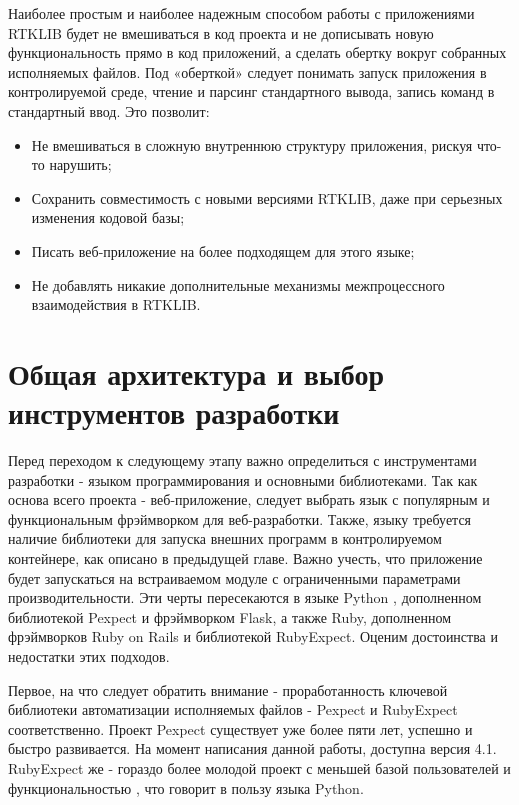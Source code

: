 Наиболее простым и наиболее надежным способом работы с приложениями RTKLIB будет не вмешиваться в код проекта и не дописывать новую функциональность прямо в код приложений, а сделать обертку вокруг собранных исполняемых файлов. Под «оберткой» следует понимать запуск приложения в контролируемой среде, чтение и парсинг стандартного вывода, запись команд в стандартный ввод. Это позволит:

\begin{itemize}
  \item Не вмешиваться в сложную внутреннюю структуру приложения, рискуя что-то нарушить;
  \item Сохранить совместимость с новыми версиями RTKLIB, даже при серьезных изменения кодовой базы;
  \item Писать веб-приложение на более подходящем для этого языке;
  \item Не добавлять никакие дополнительные механизмы межпроцессного взаимодействия в RTKLIB.
\end{itemize}


\section{Общая архитектура и выбор инструментов разработки} \label{sect2_4}

Перед переходом к следующему этапу важно определиться с инструментами разработки - языком программирования и основными библиотеками. Так как основа всего проекта - веб-приложение, следует выбрать язык с популярным и функциональным фрэймворком для веб-разработки. Также, языку требуется наличие библиотеки для запуска внешних программ в контролируемом контейнере, как описано в предыдущей главе. Важно учесть, что приложение будет запускаться на встраиваемом модуле с ограниченными параметрами производительности. Эти черты пересекаются в языке Python \cite{dive-into-python}, дополненном библиотекой Pexpect и фрэймворком Flask, а также Ruby, дополненном фрэймворков Ruby on Rails и библиотекой RubyExpect. Оценим достоинства и недостатки этих подходов.

Первое, на что следует обратить внимание - проработанность ключевой библиотеки автоматизации исполняемых файлов - Pexpect и RubyExpect соответственно. Проект Pexpect \cite{pexpect-docs} существует уже более пяти лет, успешно и быстро развивается. На момент написания данной работы, доступна версия 4.1. RubyExpect же - гораздо более молодой проект с меньшей базой пользователей и функциональностью \cite{rubyexpect-docs}, что говорит в пользу языка Python.

